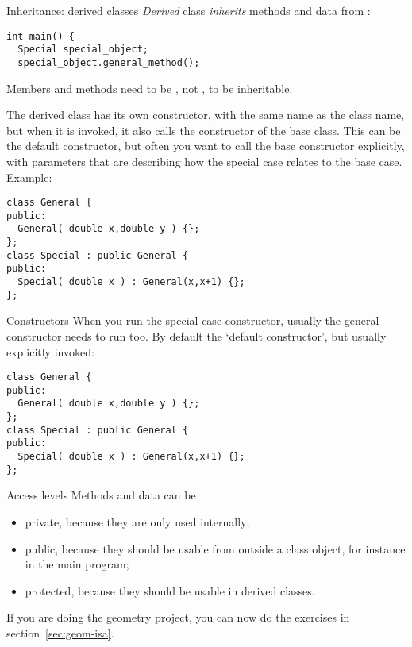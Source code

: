 \begin{slide}{Inheritance: derived classes}
  \label{sl:obj-derive}
  \emph{Derived} class 
  \emph{inherits} methods and data from
   :
\begin{lstlisting}
int main() {
  Special special_object;
  special_object.general_method();
\end{lstlisting}
Members and methods need to be , not , to be inheritable.
\end{slide}

The derived class has its own constructor, with the same name as the
class name, but when it is invoked, it also calls the constructor of
the base class. This can be the default constructor, but often you
want to call the base constructor explicitly, with parameters that are
describing how the special case relates to the base case. Example:
\begin{lstlisting}
class General {
public:
  General( double x,double y ) {};
};
class Special : public General {
public:
  Special( double x ) : General(x,x+1) {};
};
\end{lstlisting}

\begin{slide}{Constructors}
  \label{sl:obj-derive-construct}
  When you run the special case constructor, usually the general
  constructor needs to run too. By default the `default constructor',
  but usually explicitly invoked:
\begin{lstlisting}
class General {
public:
  General( double x,double y ) {};
};
class Special : public General {
public:
  Special( double x ) : General(x,x+1) {};
};
\end{lstlisting}
\end{slide}

\begin{block}{Access levels}
  \label{sl:private-etc}
  Methods and data can be
  \begin{itemize}
  \item private, because they are only used internally;
  \item public, because they should be usable from outside a class
    object, for instance in the main program;
  \item protected, because they should be usable in derived classes.
  \end{itemize}
\end{block}

\begin{exercise}
  If you are doing the geometry project, 
  you can now do the exercises in section~\ref{sec:geom-isa}.
\end{exercise}

